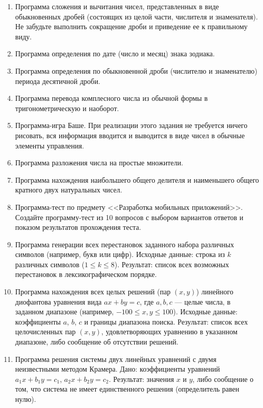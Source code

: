 \begin{enumerate}
  \item
 Программа сложения и вычитания чисел, представленных в виде обыкновенных дробей (состоящих из целой части, числителя и 
 знаменателя). Не забудьте выполнить сокращение дроби и приведение ее к правильному виду.

 

 \item
 Программа определения по дате (число и месяц) знака зодиака.
 
 \item
Программа определения по обыкновенной дроби (числителю и знаменателю) периода десятичной дроби.
 
 \item
 Программа перевода комплесного числа из обычной формы в тригонометрическую и наоборот.

 
 \item
 Программа-игра Баше. При реализации этого задания не требуется ничего рисовать, вся информация вводится и выводится в виде
 чисел в обычные элементы управления.
 
 \item
 Программа разложения числа на простые множители.
 
 \item
 Программа нахождения наибольшего общего делителя и наименьшего общего кратного двух натуральных чисел.
 
 
 \item Программа-тест по предмету <<Разработка мобильных приложений>>. Создайте программу-тест из 10 вопросов с выбором
вариантов ответов и показом результатов прохождения теста.

\item Программа генерации всех перестановок заданного набора различных символов 
(например, букв или цифр).  
      Исходные данные: строка из $k$ различных символов ($1 \leq k \leq 8$).  
      Результат: список всех возможных перестановок в лексикографическом порядке.
\item Программа нахождения всех целых решений (пар $(x, y)$) 
линейного диофантова уравнения 
вида $ax + by = c$, где $a, b, c$ — целые числа, в заданном 
диапазоне (например, $-100 \le x, y \le 100$).  
      Исходные данные: коэффициенты $a$, $b$, $c$ и границы диапазона поиска.  
      Результат: список всех целочисленных пар $(x, y)$, удовлетворяющих 
      уравнению в указанном диапазоне, либо сообщение об отсутствии решений.

\item Программа решения системы двух линейных уравнений с двумя неизвестными методом Крамера.  
      Дано: коэффициенты уравнений $a_1x + b_1y = c_1$, $a_2x + b_2y = c_2$.  
      Результат: значения $x$ и $y$, либо сообщение о том, что система не имеет единственного решения (определитель равен нулю).
\end{enumerate}

